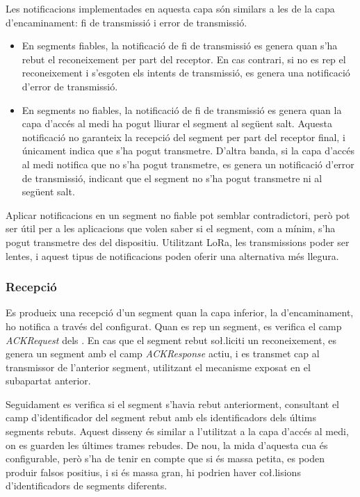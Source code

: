 \documentclass{tfgitic}[2024/07/01]
\begin{document}
{Les notificacions implementades en aquesta capa són similars a les de la capa d'encaminament: fi de transmissió i error de transmissió.
\begin{itemize}
    \item En segments fiables, la notificació de fi de transmissió es genera quan s'ha rebut el reconeixement per part del receptor. En cas contrari, si no es rep el reconeixement i s'esgoten els intents de transmissió, es genera una notificació d'error de transmissió.
    \item En segments no fiables, la notificació de fi de transmissió es genera quan la capa d'accés al medi ha pogut lliurar el segment al següent salt. Aquesta notificació no garanteix la recepció del segment per part del receptor final, i únicament indica que s'ha pogut transmetre. D'altra banda, si la capa d'accés al medi notifica que no s'ha pogut transmetre, es genera un notificació d'error de transmissió, indicant que el segment no s'ha pogut transmetre ni al següent salt.
\end{itemize}
Aplicar notificacions en un segment no fiable pot semblar contradictori, però pot ser útil per a les aplicacions que volen saber si el segment, com a mínim, s'ha pogut transmetre des del dispositiu. Utilitzant LoRa, les transmissions poder ser lentes, i aquest tipus de notificacions poden oferir una alternativa més llegura.
\subsubsection{Recepció}
Es produeix una recepció d'un segment quan la capa inferior, la d'encaminament, ho notifica a través del  configurat. Quan es rep un segment, es verifica el camp \emph{ACKRequest} dels . En cas que el segment rebut so\l.liciti un reconeixement, es genera un segment amb el camp \emph{ACKResponse} actiu, i es transmet cap al transmissor de l'anterior segment, utilitzant el mecanisme exposat en el subapartat anterior.

Seguidament es verifica si el segment s'havia rebut anteriorment, consultant el camp d'identificador del segment rebut amb els identificadors dels últims segments rebuts. Aquest disseny és similar a l'utilitzat a la capa d'accés al medi, on es guarden les últimes trames rebudes. De nou, la mida d'aquesta cua és configurable, però s'ha de tenir en compte que si és massa petita, es poden produir falsos positius, i si és massa gran, hi podrien haver co\l.lisions d'identificadors de segments diferents.

}
\end{document}
